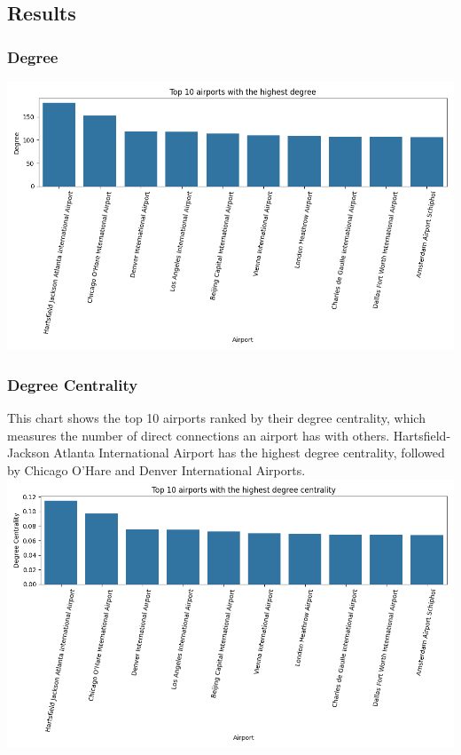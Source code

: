 \documentclass[12pt]{article}
\begin{document}
\subsection{Results}
\begin{minipage}{\textwidth}
    \subsubsection{Degree}
    \centering
    \includegraphics[width=1\linewidth]{img/degree.png}
\end{minipage}

\begin{minipage}{\textwidth}
    \subsubsection{Degree Centrality}
    {This chart shows the top 10 airports ranked by their degree centrality, which measures the number of direct connections an airport has with others. Hartsfield-Jackson Atlanta International Airport has the highest degree centrality, followed by Chicago O'Hare and Denver International Airports.}
    \centering
    \includegraphics[width=1\linewidth]{img/degree_centrality.png}
\end{minipage}
\end{document}
